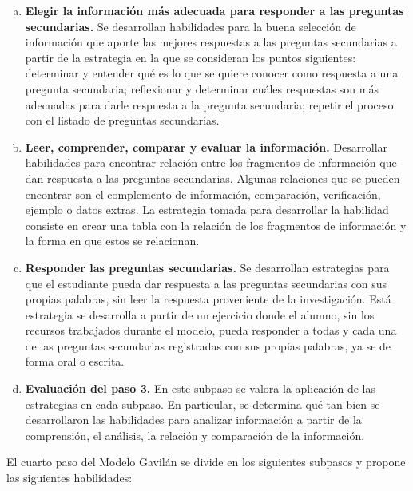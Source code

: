 \begin{enumerate}[a.]
  \item \textbf{Elegir la información más adecuada para responder a las preguntas secundarias.} Se desarrollan habilidades para la buena selección de información que aporte las mejores respuestas a las preguntas secundarias a partir de la estrategia en la que se consideran los puntos siguientes: determinar y entender qué es lo que se quiere conocer como respuesta a una pregunta secundaria; reflexionar y determinar cuáles respuestas son más adecuadas para darle respuesta a la pregunta secundaria; repetir el proceso con el listado de preguntas secundarias.
  \item \textbf{Leer, comprender, comparar y evaluar la información.} Desarrollar habilidades para encontrar relación entre los fragmentos de información que dan respuesta a las preguntas secundarias. Algunas relaciones que se pueden encontrar son el complemento de información, comparación, verificación, ejemplo o datos extras.  La estrategia tomada para desarrollar la habilidad consiste en crear una tabla con la relación de los fragmentos de información y la forma en que estos se relacionan.
  \item \textbf{Responder las preguntas secundarias.} Se desarrollan estrategias para que el estudiante pueda dar respuesta a las preguntas secundarias con sus propias palabras, sin leer la respuesta proveniente de la investigación. Está estrategia se desarrolla a partir de un ejercicio donde el alumno, sin los recursos trabajados durante el modelo, pueda responder a todas y cada una de las preguntas secundarias registradas con sus propias palabras, ya se de forma oral o escrita.
  \item \textbf{Evaluación del paso 3.} En este subpaso se valora la aplicación de las estrategias en cada subpaso. En particular, se determina qué tan bien se desarrollaron las habilidades para analizar información a partir de la comprensión, el análisis, la relación y comparación de la información.
\end{enumerate}

El cuarto paso del Modelo Gavilán se divide en los siguientes subpasos y propone las siguientes habilidades:

